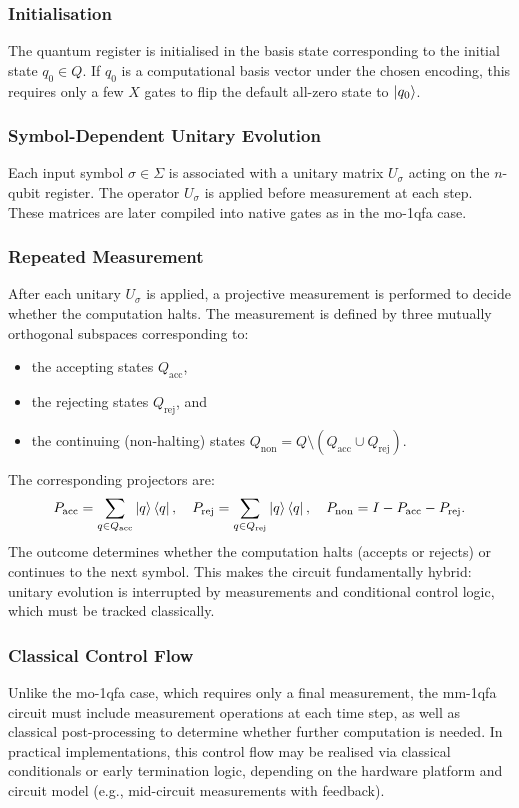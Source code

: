\subsubsection*{Initialisation}
The quantum register is initialised in the basis state corresponding to the initial state $q_0 \in Q$. If $q_0$ is a computational basis vector under the chosen encoding, this requires only a few $X$ gates to flip the default all-zero state to $\ket{q_0}$.

\subsubsection*{Symbol-Dependent Unitary Evolution}
Each input symbol $\sigma \in \Sigma$ is associated with a unitary matrix $U_\sigma$ acting on the $n$-qubit register. The operator $U_\sigma$ is applied before measurement at each step. These matrices are later compiled into native gates as in the \gls{mo-1qfa} case.

\subsubsection*{Repeated Measurement}
After each unitary $U_\sigma$ is applied, a projective measurement is performed to decide whether the computation halts. The measurement is defined by three mutually orthogonal subspaces corresponding to:
\begin{itemize}
  \item the accepting states $Q_{\text{acc}}$,
  \item the rejecting states $Q_{\text{rej}}$, and
  \item the continuing (non-halting) states $Q_{\text{non}} = Q \setminus (Q_{\text{acc}} \cup Q_{\text{rej}})$.
\end{itemize}
The corresponding projectors are:
\[
P_{\text{acc}} = \sum_{q \in Q_{\text{acc}}} \ket{q}\bra{q}, \quad
P_{\text{rej}} = \sum_{q \in Q_{\text{rej}}} \ket{q}\bra{q}, \quad
P_{\text{non}} = I - P_{\text{acc}} - P_{\text{rej}}.
\]
The outcome determines whether the computation halts (accepts or rejects) or continues to the next symbol. This makes the circuit fundamentally hybrid: unitary evolution is interrupted by measurements and conditional control logic, which must be tracked classically.

\subsubsection*{Classical Control Flow}
Unlike the \gls{mo-1qfa} case, which requires only a final measurement, the \gls{mm-1qfa} circuit must include measurement operations at each time step, as well as classical post-processing to determine whether further computation is needed. In practical implementations, this control flow may be realised via classical conditionals or early termination logic, depending on the hardware platform and circuit model (e.g., mid-circuit measurements with feedback).

